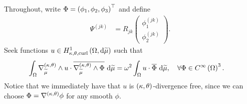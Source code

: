 \documentclass[11pt]{report}
\begin{document}
Throughout, write $\Phi = \left( \phi_1, \phi_2, \phi_3 \right)^\top$ and define 
\begin{align*}
	\Psi^{(jk)} &= R_{jk} \begin{pmatrix} \phi_1^{(jk)} \\ \phi_2^{(jk)} \end{pmatrix}.
\end{align*}
Seek functions $u\in H^1_{\kappa,\theta,\mathrm{curl}}\left( \Omega, \mathrm{d}\widetilde{\mu} \right)$ such that
\begin{align} \label{eq:PeriodCellCurlCurlWeakForm}
	\int_{\Omega} \nabla_{\widetilde{\mu}}^{\left( \kappa, \theta \right)}\wedge u\cdot\overline{\nabla_{\widetilde{\mu}}^{\left( \kappa, \theta \right)}\wedge\Phi}  \ \mathrm{d}\widetilde{\mu} &= \omega^2 \int_{\Omega} u\cdot\overline{\Phi}  \ \mathrm{d}\widetilde{\mu},
	\quad\forall \Phi\in C^{\infty}\left( \Omega \right)^3.
\end{align}
Notice that we immediately have that $u$ is $\left( \kappa, \theta \right)$-divergence free, since we can choose $\Phi = \nabla^{\left( \kappa, \theta \right)}\phi$ for any smooth $\phi$. \newline
\end{document}
